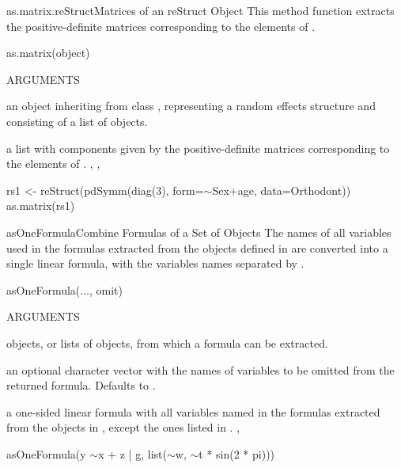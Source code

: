 \documentclass[pdftex]{article} \usepackage{url,graphicx}
\renewcommand{\Twiddle}{\mbox{\(\sim\)}}
\begin{document}
\begin{Helpfile}{as.matrix.reStruct}{Matrices of an reStruct Object}
This method function extracts the positive-definite matrices
corresponding to the  elements of .
\begin{Example}
as.matrix(object)
\end{Example}
\begin{Argument}{ARGUMENTS}
\item[\Co{object:}]
an object inheriting from class ,
representing a random effects structure and consisting of a list of
 objects.
\end{Argument}
a list with components given by the positive-definite matrices
corresponding to the elements of .
, ,
\need 15pt
\vspace{-16pt} 
\begin{Example}
rs1 <- reStruct(pdSymm(diag(3), form=\Twiddle Sex+age, data=Orthodont))
as.matrix(rs1)
\end{Example}
\end{Helpfile}
\begin{Helpfile}{asOneFormula}{Combine Formulas of a Set of Objects}
The names of all variables used in the formulas extracted from the
objects defined in  are converted into a single linear
formula, with the variables names separated by \Co{+}.
\begin{Example}
asOneFormula(..., omit)
\end{Example}
\begin{Argument}{ARGUMENTS}
\item[\Co{...:}]
objects, or lists of objects, from which a formula can be
extracted.
\item[\Co{omit:}]
an optional character vector with the names of variables to
be omitted from the returned formula. Defaults to .
\end{Argument}
a one-sided linear formula with all variables named in the formulas
extracted from the objects in , except the ones listed in
.
, 
\need 15pt
\vspace{-16pt} 
\begin{Example}
asOneFormula(y \Twiddle x + z | g, list(\Twiddle w, \Twiddle t * sin(2 * pi)))
\end{Example}
\end{Helpfile}
\end{document}
